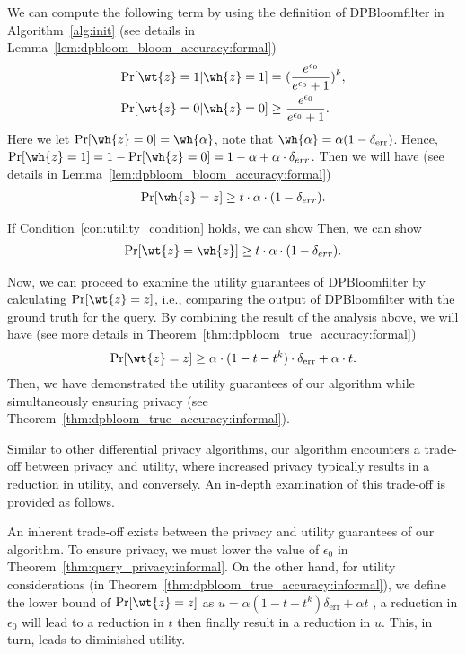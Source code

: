 We can compute the following term by using the definition of DPBloomfilter in Algorithm~\ref{alg:init}  (see details in Lemma~\ref{lem:dpbloom_bloom_accuracy:formal})
\begin{align*}
    \Pr[\wt{z}=1|\wh{z}=1] = & ~ (\frac{e^{\epsilon_0}}{e^{\epsilon_0}+1})^k, \\
     \Pr[\wt{z}=0|\wh{z}=0] \geq & ~ \frac{e^{\epsilon_0}}{e^{\epsilon_0}+1}.
\end{align*}
Here we let $\Pr[\wh{z}=0] = \wh{\alpha}$, note that $\wh{\alpha} = \alpha (1 - \delta_{\mathrm{err}})$. Hence, $\Pr[\wh{z} = 1] = 1 - \Pr[\wh{z}=0] = 1 - \alpha + \alpha \cdot \delta_{err}$. Then we will have (see details in Lemma~\ref{lem:dpbloom_bloom_accuracy:formal})
\begin{align*}
    \Pr[\wh{z} = z] \geq t \cdot \alpha \cdot (1 - \delta_{err}).
\end{align*}

\begin{lemma}\label{lem:dpbloom_bloom_accuracy:informal}
If Condition~\ref{con:utility_condition} holds, we can show
Then, we can show
\begin{align*}
\Pr[ \wt{z} = \wh{z}] \geq t \cdot \alpha \cdot (1 - \delta_{err}).
\end{align*}
\end{lemma}
Now, we can proceed to examine the utility guarantees of DPBloomfilter by calculating $\Pr[\wt{z} = z]$, i.e., comparing the output of DPBloomfilter with the ground truth for the query. 
By combining the result of the analysis above, we will have (see more details in Theorem~\ref{thm:dpbloom_true_accuracy:formal})
\begin{align*}
    \Pr[ \wt{z} = z ] \geq \alpha \cdot (1-t-t^k)\cdot \delta_{\mathrm{err}}+\alpha\cdot t. 
\end{align*}
Then, we have demonstrated the utility guarantees of our algorithm while simultaneously ensuring privacy (see Theorem~\ref{thm:dpbloom_true_accuracy:informal}).


Similar to other differential privacy algorithms, our algorithm encounters a trade-off between privacy and utility, where increased privacy typically results in a reduction in utility, and conversely. An in-depth examination of this trade-off is provided as follows.

\begin{remark} 
An inherent trade-off exists between the privacy and utility guarantees of our algorithm. To ensure privacy, we must lower the value of $\epsilon_0$ in Theorem~\ref{thm:query_privacy:informal}. On the other hand, for utility considerations (in Theorem~\ref{thm:dpbloom_true_accuracy:informal}), we define the lower bound of $\Pr[\wt{z} = z]$ as $u = \alpha(1-t-t^k)\delta_{\mathrm{err}}+\alpha t$
, a reduction in $\epsilon_0$ will lead to a reduction in $t$ then finally result in a reduction in $u$. This, in turn, leads to diminished utility.
\end{remark}

